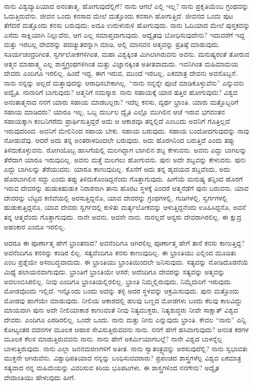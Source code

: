 ನಾನು ವಿಶ್ವವ್ಯಾಪಿಯಾದ ಅನಂತಾತ್ಮ. ಹೋಗುವುದೆಲ್ಲಿಗೆ? ನಾನು ಆಗಲೆ ಎಲ್ಲಿ ಇಲ್ಲ? ನಾನು ಪ್ರಕೃತಿಯೆಂಬ ಗ್ರಂಥವನ್ನು ಓದುತ್ತಿರುವೆನು. ಜೀವನ ಒಂದು ಕನಸಾದ ಮೇಲೆ ಮತ್ತೊಂದು ಕನಸಾಗಿ ಹೋಗುತ್ತಿದೆ. ಜೀವನದ ಒಂದು ಪುಟ ತೆಗೆದರೆ ಮತ್ತೊಂದು ಕನಸು ಬರುವುದು; ಅದೂ ಉರುಳುರುಳಿ ಹೋಗುವುದು. ನಾನು ಓದಿಯಾದ ಮೇಲೆ ಪುಸ್ತಕವನ್ನು ಎಸೆದು ಸಾಕ್ಷಿಯಾಗಿ ನಿಲ್ಲುವೆನು, ಆಗ ಎಲ್ಲ ಸಮಾಪ್ತವಾಗುವುದು. ಅದ್ವೈತವು ಬೋಧಿಸುವುದೇನು? ಇದುವರೆಗೆ ಇದ್ದ ಮತ್ತು ಇರಬಲ್ಲ ದೇವರನ್ನು ಪದಚ್ಯುತರನ್ನಾಗಿ ಮಾಡಿ, ಅಲ್ಲಿ ಮಾನವನ ಆತ್ಮವನ್ನು ಪ್ರತಿಷ್ಠೆ ಮಾಡುವುದು. ಸೂರ್ಯಚಂದ್ರರಿಗಿಂತ, ಸ್ವರ್ಗಲೋಕಗಳಿಗಿಂತ, ಮಹಾ ವಿಶ್ವಕ್ಕಿಂತ ಮಿಗಿಲಾಗಿರುವನು ಅವನು. ಮನುಷ್ಯರಂತೆ ತೋರುವ ಆತ್ಮನ ಮಾಹಾತ್ಮ್ಯ ಎಲ್ಲ ಶಾಸ್ತ್ರಗ್ರಂಥಗಳಿಗಿಂತ ಮತ್ತು ವಿಜ್ಞಾನಕ್ಕಿಂತ ಅತೀತವಾದುದು. ಇವನಿಗಿಂತ ಮಹಿಮಾಮಯ ದೇವರು ಎಂದಿಗೂ ಇರಲಿಲ್ಲ. ಹಿಂದೆ ಇದ್ದ, ಈಗ ಇರುವ, ಮುಂದೆ ಇರಬಲ್ಲ, ಏಕಮಾತ್ರ ದೇವನು ಅವನೊಬ್ಬನೆ. ನಾನು ನನ್ನನ್ನು ಅಲ್ಲದೆ ಮತ್ತಾವುದನ್ನು ಆರಾಧಿಸಬೇಕಾಗಿಲ್ಲ. “ನಾನು ನನ್ನನ್ನೇ ಪೂಜೆ ಮಾಡಿಕೊಳ್ಳುವೆನು” ಎನ್ನುವನು ಅದ್ವೈತಿ. ನಾನಾರಿಗೆ ಬಾಗುವುದು? ಆತ್ಮನಿಗೆ ನಮಸ್ಕಾರ. ನಾನು ಸಹಾಯಕ್ಕೆ ಯಾರ ಹತ್ತಿರ ಹೋಗುವುದು? ವಿಶ್ವದ ಅನಂತಾತ್ಮನಾದ ನನಗೆ ಯಾರು ಸಹಾಯ ಮಾಡಬಲ್ಲರು? ಇದೆಲ್ಲ ಕನಸು, ವ್ಯರ್ಥ ಭ್ರಾಂತಿ. ಯಾರು ಮತ್ತೊಬ್ಬರಿಗೆ ಸಹಾಯ ಮಾಡಿದರು? ಯಾರೂ ಇಲ್ಲ. ಒಬ್ಬ ದುರ್ಬಲ ದ್ವೈತಿ ಎಲ್ಲೊ ಮುಗಿಲಿನ ಆಚೆ ಇರುವ ಭಗವಂತನ ಸಹಾಯಕ್ಕಾಗಿ ಕಂಬನಿಗರೆದು ಪ್ರಾರ್ಥಿಸುತ್ತಿದ್ದರೆ ಅದು ಆ ಆಕಾಶವೂ ತನ್ನಲ್ಲಿದೆ ಎಂಬುದು ಅವನಿಗೆ ಗೊತ್ತಿಲ್ಲದೆ ಇರುವುದರಿಂದ. ಅವನಿಗೆ ಮೇಲಿನಿಂದ ಸಹಾಯ ಬೇಕು. ಸಹಾಯ ಬರುವುದು. ಸಹಾಯ ಬಂದೋದಗುವುದನ್ನು ನಾವು ನೋಡುವೆವು. ಆದರೆ ಅದು ತನ್ನ ಅಂತರಾಳದಿಂದಲೇ ಬರುವುದು. ಅದು ಹೊರಗಿನಿಂದ ಬರುತ್ತಿದೆ ಎಂದು ತಪ್ಪು ತಿಳಿದುಕೊಳ್ಳುವನು. ರೋಗಿಯೊಬ್ಬ ಹಾಸಿಗೆಯಲ್ಲಿ ಮಲಗಿದ್ದಾಗ ಬಾಗಿಲಿನ ಶಬ್ದ ಕೇಳುವನು. ಅವನು ಎದ್ದು ಬಾಗಿಲನ್ನು ತೆರೆದಾಗ ಯಾರೂ ಇರುವುದಿಲ್ಲ. ಅವನು ಮತ್ತೆ ಮಲಗಲು ಹೋಗುವನು. ಪುನಃ ಅದೇ ಶಬ್ದವನ್ನು ಕೇಳುವನು. ಪುನಃ ಎದ್ದು ಬಾಗಿಲನ್ನು ತೆರೆಯುವನು. ಯಾರೂ ಕಾಣುವುದಿಲ್ಲ. ಕೊನೆಗೆ ಅದು ತನ್ನ ಹೃದಯದ ಶಬ್ದವೆಂದು, ಅದು ಹೊರಬಾಗಿಲಿನ ಸದ್ದು ಎಂದು ತಪ್ಪು ತಿಳಿದುಕೊಂಡಿದ್ದನೆಂದು ಗೊತ್ತಾಗುವುದು. ಹೀಗೆಯೆ ಮನುಷ್ಯ ತನ್ನಿಂದ ಹೊರಗೆ ಇರುವ ದೇವರನ್ನು ಹುಡುಕಿಹುಡುಕಿ ನಿರಾಶನಾಗಿ ತಾನು ಹೊರಟ ಸ್ಥಳಕ್ಕೆ ಎಂದರೆ ಆತ್ಮನೆಡೆಗೆ ಪುನಃ ಬರುವನು. ಯಾವ ದೇವರನ್ನು ಬೆಟ್ಟದ ಕಣಿವೆಯಲ್ಲಿ ಅರಸುತ್ತಿದ್ದನೊ, ಯಾವ ದೇವರನ್ನು ಗ್ರಂಥಗಳಲ್ಲಿ, ಗುಡಿಗಳಲ್ಲಿ, ಸ್ವರ್ಗಗಳಲ್ಲಿ ಹುಡುಕುತ್ತಿದ್ದನೊ, ಯಾವ ದೇವರು ಸ್ವರ್ಗದಲ್ಲಿ ಕುಳಿತು ಮರ್ತ್ಯಲೋಕವನ್ನು ಆಳುತ್ತಿದ್ದನೆಂದು ಊಹಿಸಿದ್ದನೊ, ಅವನೆ ತನ್ನ ಆತ್ಮವೆಂದು ಗೊತ್ತಾಗುವುದು. ನಾನೇ ಅವನು, ಅವನೇ ನಾನು. ನಾನಲ್ಲದೆ ಅನ್ಯರು ದೇವರಾಗಿರಲಿಲ್ಲ. ಈ ಕ್ಷುದ್ರ ಅಹಂಕಾರ ಎಂದೂ ಇರಲಿಲ್ಲ.

ಆದರೂ ಈ ಪೂರ್ಣಾತ್ಮ ಹೇಗೆ ಭ್ರಾಂತನಾದ? ಅವನೆಂದಿಗೂ ಆಗಿರಲಿಲ್ಲ ಪೂರ್ಣಾತ್ಮ ಹೇಗೆ ತಾನೆ ಕನಸು ಕಾಣುತ್ತಿದ್ದ? ಅವನೆಂದಿಗೂ ಕನಸನ್ನು ಕಂಡಿರ ಲಿಲ್ಲ. ಸತ್ಯವೆಂದಿಗೂ ಕನಸು ಕಾಣುವುದಿಲ್ಲ. ಈ ಭ್ರಾಂತಿಯು ಎಲ್ಲಿಂದ ಮೂಡಿತು ಎಂಬ ಪ್ರಶ್ನೆಯೇ ಅಸಂಬದ್ಧವಾದುದು. ಈ ಭ್ರಾಂತಿಯು ಭ್ರಾಂತಿಯಿಂದಲೇ ಜನಿಸುವುದು. ಸತ್ಯವನ್ನು ನೋಡಿದೊಡನೆಯೆ ಮಿಥ್ಯೆ ಪಲಾಯನವಾಗುವುದು. ಭ್ರಾಂತಿಗೆ ಭ್ರಾಂತಿಯೇ ಆಸರೆ; ಅದೆಂದಿಗೂ ದೇವರನ್ನು ಸತ್ಯವನ್ನು ಆತ್ಮವನ್ನು ಅವಲಂಬಿಸಿರಲಿಲ್ಲ. ನೀವು ಎಂದಿಗೂ ಭ್ರಾಂತಿಯಲ್ಲಿರಲಿಲ್ಲ. ಭ್ರಾಂತಿ ನಿಮ್ಮಲ್ಲಿರುವುದು, ನಿಮ್ಮೆದುರಿಗೆ ಇರುವುದು. ಮೋಡವೊಂದು ಇಲ್ಲಿದೆ. ಇನ್ನೊಂದು ಬಂದು ಅದನ್ನು ತಳ್ಳಿ ಅದರ ಸ್ಥಳವನ್ನು ಆಕ್ರಮಿಸುವುದು. ಪುನಃ ಮತ್ತೊಂದು ಮೋಡವು ಹಾಗೆಯೇ ಮಾಡುವುದು. ನೀಲಿಯ ಆಕಾಶದಲ್ಲಿ ಹಲವು ಬಣ್ಣದ ಮೋಡಗಳು ಬಂದು ಕೆಲವು ಕಾಲವಿದ್ದು ಮಾಯವಾಗಿ ಪುನಃ ಅದೇ ನೀಲಿಯಾಕಾಶ ಕಾಣುವಂತೆ ನೀವು ನಿತ್ಯಮುಕ್ತರು, ನಿತ್ಯಶುದ್ಧರು ನೀವೇ ಸಾಕ್ಷಾತ್​ ವಿಶ್ವದ ದೇವರು. ಎಂದಿಗೂ ಎರಡಿರಲಿಲ್ಲ. ಒಂದೇ ಒಂದು. ನಾನು ಮತ್ತು ನೀನು ಎನ್ನುವುದು ಭ್ರಾಂತಿ. ಕೇವಲ “ನಾನು” ಎನ್ನಿ. ಕೋಟ್ಯಂತರ ವದನಗಳ ಮೂಲಕ ಆಹಾರ ಸೇವಿಸುತ್ತಿರುವವನು ನಾನು. ನನಗೆ ಹೇಗೆ ಹಸಿವಾಗುವುದು? ಅನಂತ ಕರಗಳ ಮೂಲಕ ಕೆಲಸ ಮಾಡುತ್ತಿರುವವನು ನಾನು. ನಾನು ಹೇಗೆ ಅಕರ್ಮಿಯಾಗಬಲ್ಲೆ? ನಾನೇ ವಿಶ್ವದ ಬಾಳನ್ನೆಲ್ಲ ಬಾಳುತ್ತಿರುವುದು. ನಾನು ಎಲ್ಲಾ ಜನನಮರಣಗಳಿಗೆ ಅತೀತ. ನಾನು ಸ್ವಾತಂತ್ರ್ಯವನ್ನು ಅರಸುವುದೆಲ್ಲಿ? ನಾನು ಸ್ವಭಾವತಃ ಮುಕ್ತನೇ ಆಗಿರುವೆನು. ವಿಶ್ವಾಧಿಪತಿಯಾದ ನನ್ನನ್ನು ಬಂಧಿಸುವವರಾರು? ಪ್ರಪಂಚದ ಶಾಸ್ತ್ರಗಳೆಲ್ಲ ವಿಶ್ವದ ಏಕಮಾತ್ರ ಸತ್ಯವಾದ ನನ್ನ ಮಹಿಮೆಯನ್ನು ವಿವರಿಸುವ ಕಿರಿಯ ಭೂಪಟಗಳು. ಈ ಶಾಸ್ತ್ರಗಳಿಂದ ನನಗೇನು? ಅದ್ವೈತ ವೇದಾಂತಿಯು ಹೇಳುವುದು ಹೀಗೆ.

